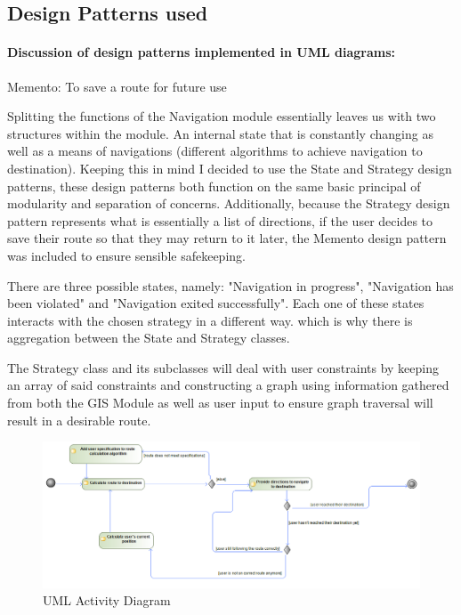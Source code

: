 	\subsection{Design Patterns used}
	\paragraph{Discussion of design patterns implemented in UML diagrams:}
		Memento: To save a route for future use
		
		Splitting the functions of the Navigation module essentially leaves us with two structures within the module. An internal state that is constantly changing as well as a means of navigations (different algorithms to achieve navigation to destination). Keeping this in mind I decided to use the State and Strategy design patterns, these design patterns both function on the same basic principal of modularity and separation of concerns. Additionally, because the Strategy design pattern represents what is essentially a list of directions, if the user decides to save their route so that they may return to it later, the Memento design pattern was included to ensure sensible safekeeping.
		
		There are three possible states, namely: "Navigation in progress", "Navigation has been violated" and "Navigation exited successfully". Each one of these states interacts with the chosen strategy in a different way. which is why there is aggregation between the State and Strategy classes.
		
		The Strategy class and its subclasses will deal with user constraints by keeping an array of said constraints and constructing a graph using information gathered from both the GIS Module as well as user input to ensure graph traversal will result in a desirable route. 
	
	\begin{figure}
	  \includegraphics[width=\linewidth]{NavigationModuleActivityDiagram.png}
	  \caption{UML Activity Diagram}
	  \label{fig:UML2}
	\end{figure}
	
